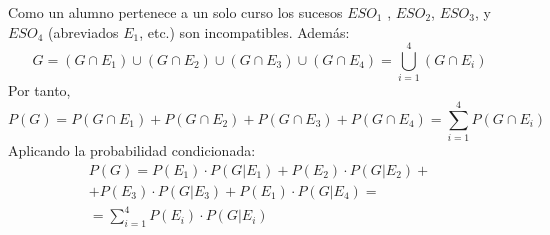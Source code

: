 %
%
%    
%    
%    
%
%
%
%
%
%
%
%
%
%



Como un alumno pertenece a un solo curso los sucesos $ESO_1$ , $ESO_2$, $ESO_3$, y $ESO_4$ (abreviados $E_1$, etc.) son incompatibles. Además: $$G=(G \cap E_1)\cup(G \cap E_2)\cup(G \cap E_3)\cup(G \cap E_4)=\bigcup_{i=1}^4(G \cap E_i)$$
Por tanto,
$$P(G)=P(G \cap E_1)+P(G \cap E_2)+P(G \cap E_3)+P(G \cap E_4)=\sum_{i=1}^4 P(G \cap E_i)$$
Aplicando la probabilidad condicionada:
\begin{eqnarray*}
P(G)=P(E_1)\cdot P(G|E_1)+P(E_2)\cdot P(G|E_2)+\\+P(E_3)\cdot P(G|E_3)+P(E_1)\cdot P(G|E_4)= \\ =\sum_{i=1}^4 P(E_i)\cdot  P(G|E_i)
\end{eqnarray*}

